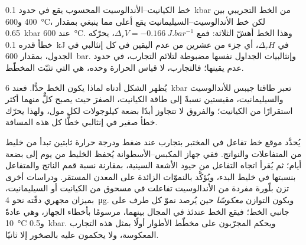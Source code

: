 خط الكيانيت--الأندالوسيت المحسوب يقع في حدود \qty{0.1}{kbar} من الخط التجريبي
بين 400 و\qty{600}{\celsius}، لكن خط الأندالوسيت--السيليمانيت يقع
أعلى مما ينبغي بمقدار \qty{0.65}{kbar} عند \qty{600}{\celsius}. وهذا الخط أهشّ
الثلاثة: فمع $\Delta_r V = \qty{-0.166}{J.bar^{-1}}$، يحرّكه خطأ قدره \qty{0.1}{kJ} في
$\Delta_r H$، أي جزء من عشرين من عدم اليقين في كل إنثالبي في الجدول، بمقدار
\qty{600}{bar}. وإنثالبيات الجداول نفسها مضبوطة لتلائم
التجارب، في حدود عدم يقينها؛ فالتجارب، لا قياس الحرارة وحده، هي التي تثبّت
المخطّط.

يُظهر الشكل أدناه لماذا يكون الخط حدًّا. فعند \qty{6}{kbar} تعبر طاقتا جيبس
للأندالوسيت والسيليمانيت، مقيستين نسبةً إلى طاقة الكيانيت، الصفرَ حيث يصبح كلٌّ منهما
أكثر استقرارًا من الكيانيت؛ والفروق لا تتجاوز أبدًا بضعة كيلوجولات لكل مول،
ولهذا يحرّك خطأ صغير في إنثالبي خطًّا كل هذه المسافة.

\begin{omfigure}
\centering
{}
\par{}
\end{omfigure}

\begin{inthelab}
يُحدَّد موقع خط تفاعل في المختبر بتجارب عند ضغط ودرجة حرارة ثابتين
تبدأ من خليط من المتفاعلات والنواتج. ففي جهاز
المكبس--الأسطوانة يُحفظ الخليط من يوم إلى بضعة أيام؛ ثم يُقرأ اتجاه التفاعل
من حيود الأشعة السينية، بمقارنة نسبة قمم الناتج والمتفاعل
بنسبتها في خليط البدء، ويُؤكَّد بالنموّات الزائدة على المعدن المستقر. ودراسات
أخرى تزن بلّورة مفردة من الأندالوسيت تفاعلت في مسحوق من الكيانيت أو
السيليمانيت، بميزان مجهري دقّته نحو \qty{4}{\micro g}. ويكون التوازن
\emph{معكوسًا} حين يُرصد نموّ كل طرف على جانبي الخط؛
فيقع الخط عندئذ في المجال بينهما، مرسومًا بأخطاء الجهاز،
وهي عادةً \qty{10}{\celsius} و\qty{0.5}{kbar}. ويحكم المجرّبون على مخطّط الأطوار أولًا
بمثل هذه التجارب المعكوسة، ولا يحكمون عليه بالصخور إلا ثانيًا.
\end{inthelab}

